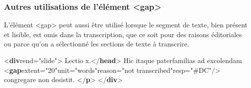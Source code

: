 \documentclass[]{beamer}\makeatletter
\begin{document}
\begin{frame}[fragile]
\frametitle{Autres utilisations de l’élément {\color{blue2}<gap>}}\par
L’élément {\color{blue2}<gap>} peut aussi être utilisé lorsque le segment de      texte, bien présent et lisible, est omis dans la transcription, que ce      soit pour des raisons éditoriales ou parce qu’on a sélectionné les      sections de texte à transcrire. 
\bgroup\ttfamily\fontsize{8.5pt}{9pt}\selectfont\par
\begin{exampleblock}{}
\noindent\ttfamily\mbox{}{\color{blue1}<\textbf{div}\hspace*{6pt}rend="{\color{blue2}slide}">}\mbox{}\newline 
{}Lectio x.{\color{blue1}</\textbf{head}>}\mbox{}\newline 
{} Hic itaque paterfamilias ad excolendam {\color{blue1}<\textbf{gap}\hspace*{6pt}extent="{\color{blue2}20}"\hspace*{6pt}unit="{\color{blue2}words}"\hspace*{6pt}reason="{\color{blue2}not transcribed}"\hspace*{6pt}resp="{\color{blue2}#DC}"/>} congregare\mbox{}\newline 
\hspace*{6pt}\hspace*{6pt} non desistit. {\color{blue1}</\textbf{p}>}\mbox{}\newline 
{\color{blue1}</\textbf{div}>}
\end{exampleblock}
\par\egroup
       
\end{frame}
\end{document}
